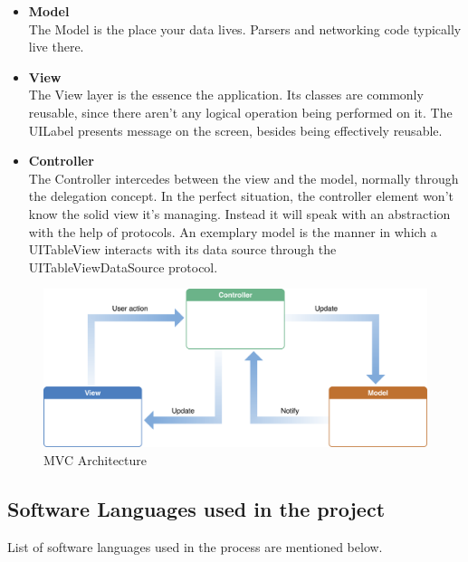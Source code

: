 \begin{itemize}
    \item \textbf{Model} \\
    The Model is the place your data lives. Parsers and networking code typically live there. \\
    
    \item \textbf{View} \\
    The View layer is the essence the application. Its classes are commonly reusable, since there aren't any logical operation being performed on it. The UILabel presents message on the screen, besides being effectively reusable. \\
  
    \item \textbf{Controller} \\
    The Controller intercedes between the view and the model, normally through the delegation concept. In the perfect situation, the controller element won't know the solid view it's managing. Instead it will speak with an abstraction with the help of protocols. An exemplary model is the manner in which a UITableView interacts with its data source through the UITableViewDataSource protocol. \\
    
\end{itemize}

    \begin{figure}[H]
            \centering
            \includegraphics[width=1.0\linewidth]{figures/ch4/mvc.png}
            \caption{\label{fig:mvc} MVC Architecture \cite{MVC_Apple}}
        \end{figure}

\subsection{Software Languages used in the project}

List of software languages used in the process are mentioned below.


